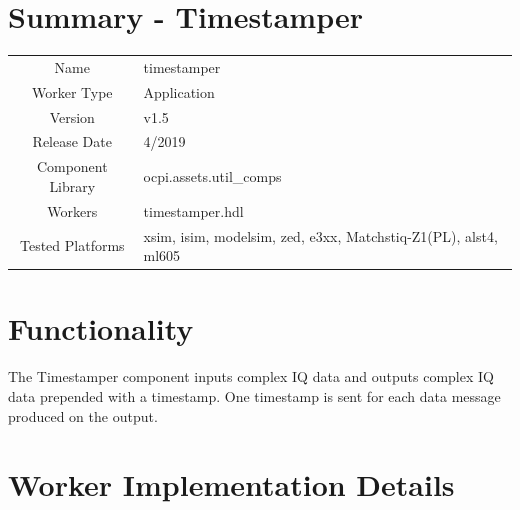 \documentclass{article}
\author{} %
\date{Version \docVersion} %
\title{\docTitle}
\def\docVersion{1.5}
\def\comp{timestamper}
\def\Comp{Timestamper}
\begin{document}
\section*{Summary - \Comp}
\begin{tabular}{|c|M{13.5cm}|}
	\hline
	                  &                        \\
	\hline
	Name              & \comp                  \\
	\hline
	Worker Type       & Application            \\
	\hline
	Version           & v\docVersion \\
	\hline
	Release Date      & 4/2019 \\
	\hline
	Component Library & ocpi.assets.util\_comps \\
	\hline
	Workers           & \comp.hdl              \\
	\hline
	Tested Platforms  & xsim, isim, modelsim, zed, e3xx, Matchstiq-Z1(PL), alst4, ml605 \\
	\hline
\end{tabular}

\section*{Functionality}
\begin{flushleft}
	The Timestamper component inputs complex IQ data and outputs complex IQ data prepended with a timestamp. One timestamp is sent for each data message produced on the output.
\end{flushleft}

\section*{Worker Implementation Details}
\end{document}
